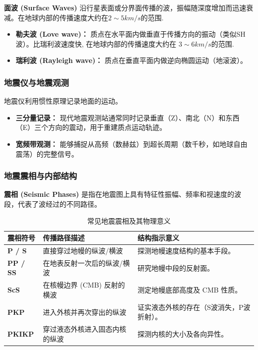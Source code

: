 \documentclass[12pt,a4paper]{article}
\begin{document}
	\textbf{面波 (Surface Waves)}
	沿行星表面或分界面传播的波，振幅随深度增加而迅速衰减。在地球内部的传播速度大约在$ 2\sim5km/s $的范围.
	\begin{itemize}
		\item \textbf{勒夫波 (Love wave)：} 质点在水平面内做垂直于传播方向的振动（类似SH波）。比瑞利波速度快,
		在地球内部的传播速度大约在 $3\sim6km/s$的范围.
		\item \textbf{瑞利波 (Rayleigh wave)：} 质点在垂直平面内做逆向椭圆运动（地滚波）。
	\end{itemize}
	
	\subsubsection{地震仪与地震观测}
	地震仪利用惯性原理记录地面的运动。
	\begin{itemize}
		\item \textbf{三分量记录：} 现代地震观测站通常同时记录垂直（Z）、南北（N）和东西（E）三个方向的震动，用于重建质点运动轨迹。
		\item \textbf{宽频带观测：} 能够捕捉从高频（数赫兹）到超长周期（数千秒，如地球自由震荡）的完整信号。
	\end{itemize}
	
	\subsubsection{地震震相与内部结构}
	\textbf{震相 (Seismic Phases)} 是指在地震图上具有特征性振幅、频率和视速度的波段，代表了波经过的不同路径。
	
	\begin{table}[htbp]
		\centering
		\caption{常见地震震相及其物理意义}
		\begin{tabularx}{\textwidth}{l l X}
			\toprule
			震相符号 & 传播路径描述 & 结构指示意义 \\
			\midrule
			\textbf{P / S} & 直接穿过地幔的纵波/横波 & 探测地幔速度结构的基本手段。 \\
			\textbf{PP / SS} & 在地表反射一次后的纵波/横波 & 研究地幔中段的反射面。 \\
			\textbf{ScS} & 在核幔边界 (CMB) 反射的横波 & 测定地幔底部高度及 CMB 性质。 \\
			\textbf{PKP} & 进入外核并再次穿出的纵波 & 证实液态外核的存在（S波消失，P波折射）。 \\
			\textbf{PKIKP} & 穿过液态外核进入固态内核的纵波 & 探测内核的大小及各向异性。 \\
			\bottomrule
		\end{tabularx}
	\end{table}
	
\end{document}
